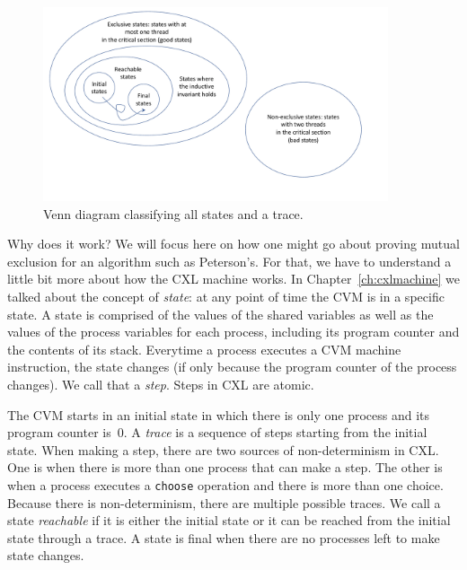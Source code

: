 \documentclass{report}
\begin{document}
\begin{figure}
\begin{center}
\includegraphics[width=4in]{figures/states-crop.pdf}
\end{center}
\caption{Venn diagram classifying all states and a trace.}
\label{fig:states}
\end{figure}

Why does it work?  We will focus here on how one might go about proving
mutual exclusion for an algorithm such as Peterson's.
For that, we have to understand a little bit more about how the CXL
machine works.
In Chapter~\ref{ch:cxlmachine} we talked about the concept of \emph{state}:
at any point of time the CVM is in a specific state.
A state is comprised of the values of the shared variables as well as
the values of the process variables
for each process, including its
program counter and the contents of its stack.
Everytime a process executes a CVM machine instruction, the
state changes (if only because the program counter of the process
changes).  We call that a \emph{step}.
Steps in CXL are atomic.

The CVM starts in an initial state in which there is only
one process and its program counter is~0.  A \emph{trace}
is a sequence of steps starting from the initial state.
When making a step, there are two sources of non-determinism
in CXL.
One is when
there is more than one process that can make a step.  The other is
when a process executes a \texttt{choose} operation and there is
more than one choice.
Because there is non-determinism, there are multiple possible traces.
We call a state \emph{reachable}
if it is either the initial state
or it can be reached from the initial state through a trace.
A state is final
when there are no processes left to make state changes.
\end{document}
